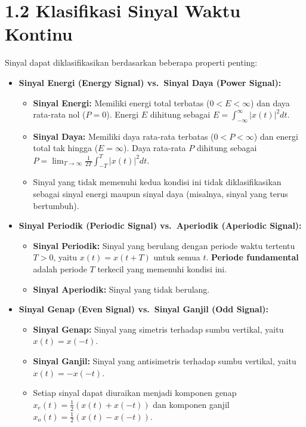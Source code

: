 \documentclass[
  letterpaper,
  DIV=11,
  numbers=noendperiod]{scrreprt}
\providecommand{\tightlist}{%
  \setlength{\itemsep}{0pt}\setlength{\parskip}{0pt}}\usepackage{longtable,booktabs,array}
\begin{document}
\section{1.2 Klasifikasi Sinyal Waktu
Kontinu}\label{klasifikasi-sinyal-waktu-kontinu}

Sinyal dapat diklasifikasikan berdasarkan beberapa properti penting:

\begin{itemize}
\item
  \textbf{Sinyal Energi (Energy Signal) vs.~Sinyal Daya (Power Signal):}

  \begin{itemize}
  \tightlist
  \item
    \textbf{Sinyal Energi:} Memiliki energi total terbatas
    (\(0 < E < \infty\)) dan daya rata-rata nol (\(P=0\)). Energi \(E\)
    dihitung sebagai \(E = \int_{-\infty}^{\infty} |x(t)|^2 dt\).
  \item
    \textbf{Sinyal Daya:} Memiliki daya rata-rata terbatas
    (\(0 < P < \infty\)) dan energi total tak hingga (\(E=\infty\)).
    Daya rata-rata \(P\) dihitung sebagai
    \(P = \lim_{T \to \infty} \frac{1}{2T} \int_{-T}^{T} |x(t)|^2 dt\).
  \item
    Sinyal yang tidak memenuhi kedua kondisi ini tidak diklasifikasikan
    sebagai sinyal energi maupun sinyal daya (misalnya, sinyal yang
    terus bertumbuh).
  \end{itemize}
\item
  \textbf{Sinyal Periodik (Periodic Signal) vs.~Aperiodik (Aperiodic
  Signal):}

  \begin{itemize}
  \tightlist
  \item
    \textbf{Sinyal Periodik:} Sinyal yang berulang dengan periode waktu
    tertentu \(T > 0\), yaitu \(x(t) = x(t+T)\) untuk semua \(t\).
    \textbf{Periode fundamental} adalah periode \(T\) terkecil yang
    memenuhi kondisi ini.
  \item
    \textbf{Sinyal Aperiodik:} Sinyal yang tidak berulang.
  \end{itemize}
\item
  \textbf{Sinyal Genap (Even Signal) vs.~Sinyal Ganjil (Odd Signal):}

  \begin{itemize}
  \tightlist
  \item
    \textbf{Sinyal Genap:} Sinyal yang simetris terhadap sumbu vertikal,
    yaitu \(x(t) = x(-t)\).
  \item
    \textbf{Sinyal Ganjil:} Sinyal yang antisimetris terhadap sumbu
    vertikal, yaitu \(x(t) = -x(-t)\).
  \item
    Setiap sinyal dapat diuraikan menjadi komponen genap
    \(x_e(t) = \frac{1}{2}(x(t) + x(-t))\) dan komponen ganjil
    \(x_o(t) = \frac{1}{2}(x(t) - x(-t))\).
  \end{itemize}
\end{itemize}
\end{document}
